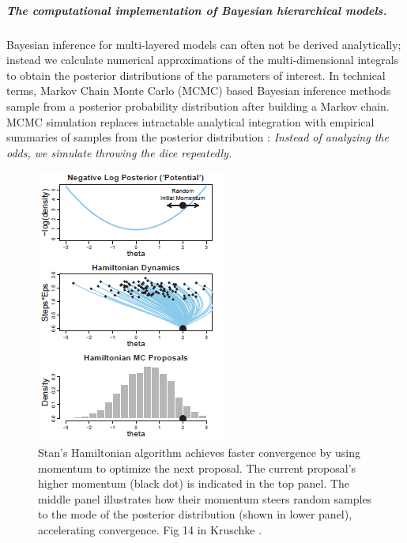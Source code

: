 \documentclass[11pt,notitlepage]{article}
\begin{document}
\subparagraph*{The computational implementation of Bayesian hierarchical models.}
Bayesian inference for multi-layered models can often not be derived analytically; instead we calculate numerical approximations of the multi-dimensional integrals to obtain the posterior distributions of the parameters of interest. In technical terms, Markov Chain Monte Carlo (MCMC) based Bayesian inference methods sample from a posterior probability distribution after building a Markov chain. MCMC simulation replaces intractable analytical integration with empirical summaries of samples from the posterior distribution \cite{Abrams_9483729}: \textit{Instead of analyzing the odds, we simulate throwing the dice repeatedly.}

\begin{figure}
 \includegraphics[scale=1]{Figures/Hamiltonian.png}
  \vspace{-20pt}
  \caption{\footnotesize Stan's Hamiltonian algorithm achieves faster convergence by using momentum to optimize the next proposal. The current proposal's higher momentum (black dot) is indicated in the top panel. The middle panel illustrates how their momentum steers random samples to the mode of the posterior distribution (shown in lower panel), accelerating convergence. Fig 14 in Kruschke \cite{Kruschke_Book_2014}.}
    \label{fig:Hamiltonian}
 \vspace{- 10 pt}
\end{figure}
\end{document}
